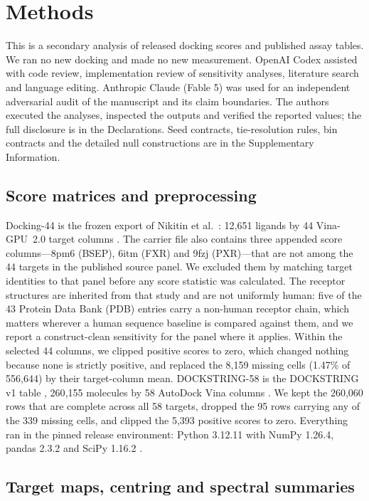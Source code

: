 \section{Methods}

This is a secondary analysis of released docking scores and published assay tables. We ran no
new docking and made no new measurement. OpenAI Codex assisted with code review, implementation
review of sensitivity analyses, literature search and language editing. Anthropic Claude (Fable 5)
was used for an independent adversarial audit of the manuscript and its claim boundaries. The authors
executed the analyses, inspected the outputs and verified the reported values; the full disclosure is
in the Declarations. Seed contracts, tie-resolution rules, bin contracts
and the detailed null constructions are in the Supplementary Information.

\subsection{Score matrices and preprocessing}

Docking-44 is the frozen export of Nikitin et al.~\cite{nikitin2025}: 12{,}651 ligands by 44
Vina-GPU~2.0 target columns \cite{ding2023}. The carrier file also contains three appended score
columns---8pm6 (BSEP), 6itm (FXR) and 9fzj (PXR)---that are not among the 44 targets in the
published source panel. We excluded them by matching target identities to that panel before any
score statistic was calculated. The receptor structures are inherited from that
study and are not uniformly human: five of the 43 Protein Data Bank (PDB) entries carry a non-human receptor chain,
which matters wherever a human sequence baseline is compared against them, and we report a
construct-clean sensitivity for the panel where it applies. Within the selected 44 columns, we
clipped positive scores to zero, which changed nothing because none is strictly positive, and
replaced the 8{,}159 missing cells (1.47\% of
556{,}644) by their target-column mean. DOCKSTRING-58 is the DOCKSTRING v1 table
\cite{dockstring2022}, 260{,}155 molecules by 58 AutoDock Vina columns \cite{vina2010}. We kept
the 260{,}060 rows that are complete across all 58 targets, dropped the 95 rows carrying any of
the 339 missing cells, and clipped the 5{,}393 positive scores to zero. Everything ran in the
pinned release environment: Python 3.12.11 with NumPy 1.26.4, pandas 2.3.2 and SciPy 1.16.2
\cite{numpy2020,scipy2020}.

\subsection{Target maps, centring and spectral summaries}

